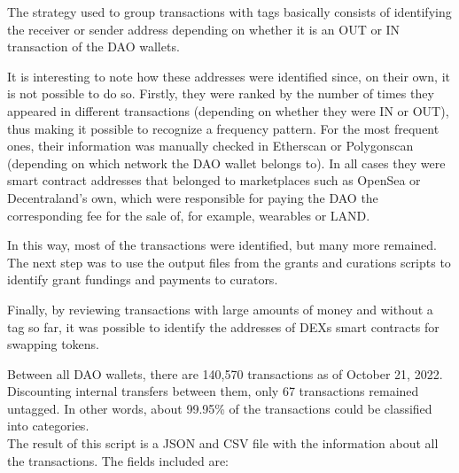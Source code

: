\documentclass[MSE,Master,english]{twbook}%
\begin{document}
The strategy used to group transactions with tags basically consists of identifying the receiver or sender address depending on whether it is an OUT or IN transaction of the DAO wallets.

It is interesting to note how these addresses were identified since, on their own, it is not possible to do so. Firstly, they were ranked by the number of times they appeared in different transactions (depending on whether they were IN or OUT), thus making it possible to recognize a frequency pattern. For the most frequent ones, their information was manually checked in Etherscan\cite{etherscan} or Polygonscan\cite{polygonscan} (depending on which network the DAO wallet belongs to). In all cases they were smart contract addresses that belonged to marketplaces such as OpenSea\cite{opensea} or Decentraland's own\cite{DCLMarket}, which were responsible for paying the DAO the corresponding fee for the sale of, for example, wearables or LAND.

In this way, most of the transactions were identified, but many more remained. The next step was to use the output files from the grants and curations scripts to identify grant fundings and payments to curators.

Finally, by reviewing transactions with large amounts of money and without a tag so far, it was possible to identify the addresses of \ac{DEXs} smart contracts for swapping tokens.

Between all DAO wallets, there are 140,570 transactions as of October 21, 2022. Discounting internal transfers between them, only 67 transactions remained untagged. In other words, about 99.95\% of the transactions could be classified into categories. \\

The result of this script is a JSON and CSV file with the information about all the transactions. The fields included are:
\end{document}
